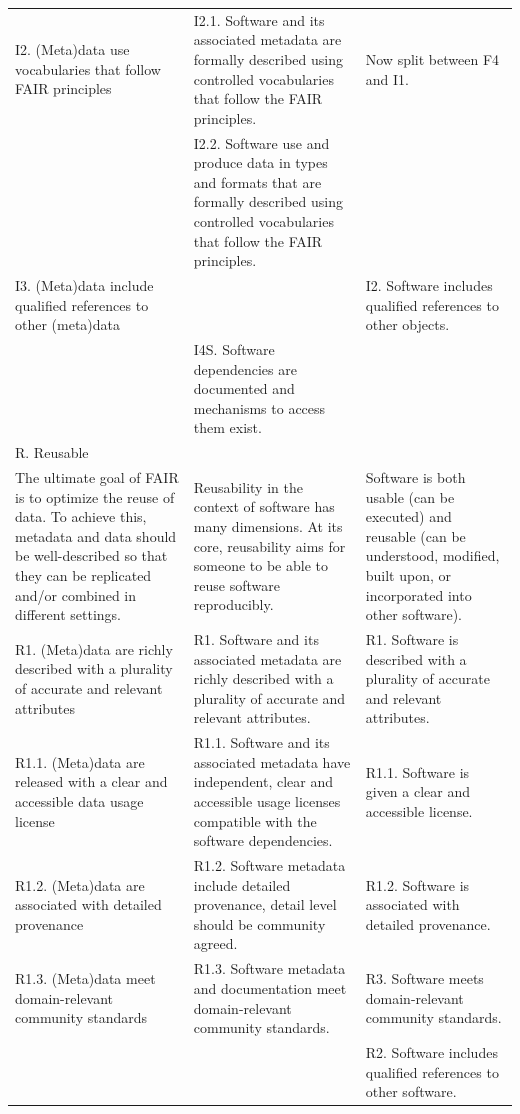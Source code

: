 {\begin{longtable}{@{\extracolsep{\fill}} p{6cm}   p{6cm}  p{6cm}}
\hline
I2. (Meta)data use vocabularies that follow FAIR principles & I2.1. Software and its associated metadata are formally described using controlled vocabularies that follow the FAIR principles. & Now split between F4 and I1. \\
 & I2.2. Software use and produce data in types and formats that are formally described using controlled vocabularies that follow the FAIR principles. &  \\
\hline
I3. (Meta)data include qualified references to other (meta)data &  & I2. Software includes qualified references to other objects. \\
\hline
 & I4S. Software dependencies are documented and mechanisms to access them exist. &  \\
\hline
\multicolumn{2}{l}{R. Reusable} &  \\
\hline
The ultimate goal of FAIR is to optimize the reuse of data. To achieve this, metadata and data should be well-described so that they can be replicated and/or combined in different settings. & Reusability in the context of software has many dimensions. At its core, reusability aims for someone to be able to reuse software reproducibly. & Software is both usable (can be executed) and reusable (can be understood, modified, built upon, or incorporated into other software). \\
\hline
R1. (Meta)data are richly described with a plurality of accurate and relevant attributes & R1. Software and its associated metadata are richly described with a plurality of accurate and relevant attributes. & R1. Software is described with a plurality of accurate and relevant attributes. \\
\hline
R1.1. (Meta)data are released with a clear and accessible data usage license & R1.1. Software and its associated metadata have independent, clear and accessible usage licenses compatible with the software dependencies. & R1.1. Software is given a clear and accessible license. \\
\hline
R1.2. (Meta)data are associated with detailed provenance & R1.2. Software metadata include detailed provenance, detail level should be community agreed. & R1.2. Software is associated with detailed provenance. \\
\hline
R1.3. (Meta)data meet domain-relevant community standards & R1.3. Software metadata and documentation meet domain-relevant community standards. & R3. Software meets domain-relevant community standards. \\
\hline
 &  & R2. Software includes qualified references to other software.
\hline
\end{longtable}}



